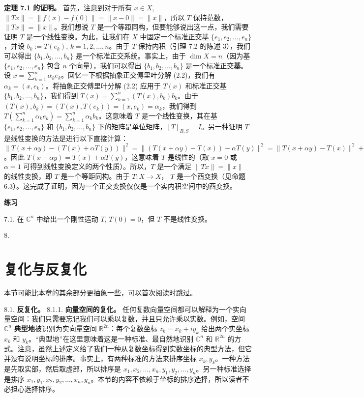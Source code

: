 \textbf{定理 7.1 的证明。} 首先，注意到对于所有 $x \in X$, $\|Tx\| = \|f(x) - f(0)\| = \|x - 0\| = \|x\|$，所以 $T$ 保持范数，$\|Tx\| = \|x\|$。我们想说 $T$ 是一个等距同构，但要能够说出这一点，我们需要证明 $T$ 是一个线性变换。为此，让我们在 $X$ 中固定一个标准正交基 $\{e_1, e_2, \dots, e_n\}$，并设 $b_k := T(e_k)$, $k=1, 2, \dots, n$。由于 $T$ 保持内积（引理 7.2 的陈述 3），我们可以得出 $\{b_1, b_2, \dots, b_n\}$ 是一个标准正交系统。事实上，由于 $\dim X = n$（因为基 $\{e_1, e_2, \dots, e_n\}$ 包含 $n$ 个向量），我们可以得出 $\{b_1, b_2, \dots, b_n\}$ 是一个标准正交\textbf{基}。设 $x = \sum_{k=1}^n \alpha_k e_k$。回忆一下根据抽象正交傅里叶分解 (2.2)，我们有 $\alpha_k = (x, e_k)$。将抽象正交傅里叶分解 (2.2) 应用于 $T(x)$ 和标准正交基 $\{b_1, b_2, \dots, b_n\}$，我们得到 $T(x) = \sum_{k=1}^n (T(x), b_k) b_k$。由于 $(T(x), b_k) = (T(x), T(e_k)) = (x, e_k) = \alpha_k$，我们得到 $T(\sum_{k=1}^n \alpha_k e_k) = \sum_{k=1}^n \alpha_k b_k$。这意味着 $T$ 是一个线性变换，其在基 $\{e_1, e_2, \dots, e_n\}$ 和 $\{b_1, b_2, \dots, b_n\}$ 下的矩阵是单位矩阵，$[T]_{B,S} = I$。另一种证明 $T$ 是线性变换的方法是进行以下直接计算：$\|T(x + \alpha y) - (T(x) + \alpha T(y))\|^2 = \|(T(x + \alpha y) - T(x)) - \alpha T(y)\|^2 = \|T(x + \alpha y) - T(x)\|^2 + \alpha^2 \|T(y)\|^2 - 2\alpha (T(x + \alpha y) - T(x), T(y)) = \|x + \alpha y - x\|^2 + \alpha^2\|y\|^2 - 2\alpha(T(x+\alpha y), T(y)) + 2\alpha(T(x), T(y)) = \|\alpha y\|^2 + \alpha^2\|y\|^2 - 2\alpha(x+\alpha y, y) + 2\alpha(x, y) = \alpha^2\|y\|^2 + \alpha^2\|y\|^2 - 2\alpha(x, y) - 2\alpha^2(y, y) + 2\alpha(x, y) = 2\alpha^2\|y\|^2 - 2\alpha^2\|y\|^2 = 0$。因此 $T(x+\alpha y) = T(x) + \alpha T(y)$，这意味着 $T$ 是线性的（取 $x=0$ 或 $\alpha=1$ 可得到线性变换定义的两个性质）。所以，$T$ 是一个满足 $\|Tx\| = \|x\|$ 的线性变换，即 $T$ 是一个等距同构。由于 $T: X \to X$， $T$ 是一个酉变换（见命题 6.3）。这完成了证明，因为一个正交变换仅仅是一个实内积空间中的酉变换。

\textbf{练习}~

7.1. 在 $\mathbb{C}^n$ 中给出一个刚性运动 $T$, $T(0)=0$，但 $T$ 不是线性变换。




8. 
\section{复化与反复化}
本节可能比本章的其余部分更抽象一些，可以首次阅读时跳过。

8.1. \textbf{反复化。}
8.1.1. \textbf{向量空间的复化。} 任何复数向量空间都可以解释为一个实向量空间：我们只需要忘记我们可以乘以复数，并且只允许乘以实数。例如，空间 $\mathbb{C}^n$ \textbf{典型地}被识别为实向量空间 $\mathbb{R}^{2n}$：每个复数坐标 $z_k = x_k + iy_k$ 给出两个实坐标 $x_k$ 和 $y_k$。“典型地”在这里意味着这是一种标准、最自然地识别 $\mathbb{C}^n$ 和 $\mathbb{R}^{2n}$ 的方式。注意，虽然上述定义给了我们一种从复数坐标得到实数坐标的典型方法，但它并没有说明坐标的排序。事实上，有两种标准的方法来排序坐标 $x_k, y_k$。一种方法是先取实部，然后取虚部，所以排序是 $x_1, x_2, \dots, x_n, y_1, y_2, \dots, y_n$。另一种标准选择是排序 $x_1, y_1, x_2, y_2, \dots, x_n, y_n$。本节的内容不依赖于坐标的排序选择，所以读者不必担心选择排序。

